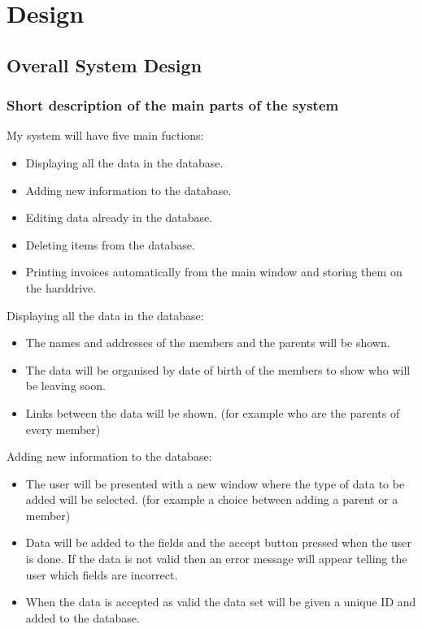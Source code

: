 \chapter{Design}

\section{Overall System Design}

\subsection{Short description of the main parts of the system}
My system will have five main fuctions:
\begin{itemize}
	\item Displaying all the data in the database.
	\item Adding new information to the database.
	\item Editing data already in the database.
	\item Deleting items from the database.
	\item Printing invoices automatically from the main window and storing them on the harddrive.
\end{itemize}

Displaying all the data in the database:
\begin{itemize}
	\item The names and addresses of the members and the parents will be shown.
	\item The data will be organised by date of birth of the members to show who will be leaving soon.
	\item Links between the data will be shown. (for example who are the parents of every member)
\end{itemize}

Adding new information to the database:
\begin{itemize}
	\item The user will be presented with a new window where the type of data to be added will be selected. (for example a choice between adding a parent or a member)
	\item Data will be added to the fields and the accept button pressed when the user is done. If the data is not valid then an error message will appear telling the user which fields are incorrect.
	\item When the data is accepted as valid the data set will be given a unique ID and added to the database.
\end{itemize}

